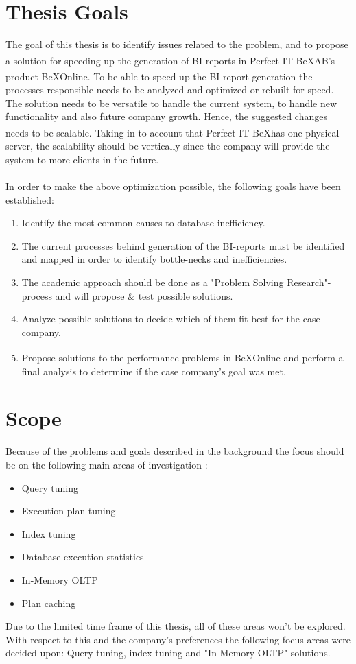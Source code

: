 \documentclass{cslthse-msc}
\newcommand{\bex}{BeX\textsuperscript{\textregistered}}
\begin{document}
\section{Thesis Goals} \label{sec:goals}
The goal of this thesis is to identify issues related to the problem, and to propose a solution for speeding up the generation of BI reports in Perfect IT \bex AB's product \bex Online. To be able to speed up the BI report generation the processes responsible needs to be analyzed and optimized or rebuilt for speed. The solution needs to be versatile to handle the current system, to handle new functionality and also future company growth. Hence, the suggested changes needs to be scalable. Taking in to account that Perfect IT \bex has one physical server, the scalability should be vertically \cite{scalability} since the company will provide the system to more clients in the future.\\\\
In order to make the above optimization possible, the following goals have been established:
\begin{enumerate}
\item Identify the most common causes to database inefficiency.
\item The current processes behind generation of the BI-reports must be identified and mapped in order to identify bottle-necks and inefficiencies.
\item The academic approach should be done as a "Problem Solving Research"-process and will propose \& test possible solutions.
\item Analyze possible solutions to decide which of them fit best for the case company.
\item Propose solutions to the performance problems in \bex Online and perform a final analysis to determine if the case company's goal was met.
\end{enumerate}
  
\section{Scope} \label{sec:scope}
Because of the problems and goals described in the background the focus should be on the following main areas of investigation \cite{Nevarez}:
\begin{itemize}
\item Query tuning
\item Execution plan tuning
\item Index tuning
\item Database execution statistics
\item In-Memory OLTP
\item Plan caching
\end{itemize}
Due to the limited time frame of this thesis, all of these areas won't be explored. With respect to this and the company's preferences the following focus areas were decided upon: Query tuning, index tuning and "In-Memory OLTP"-solutions.
\end{document}
